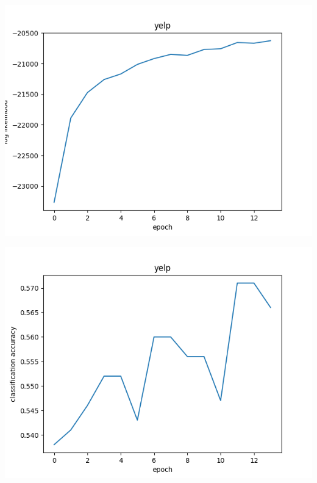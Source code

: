 \documentclass[letterpaper, 11pt]{article}
\begin{document}
\begin{multicols}{2}
\begin{center}
\includegraphics[scale=.3]{yelp_log_like_short}
\end{center}

\begin{center}
\includegraphics[scale=.3]{yelp_acc_short}
\end{center}


\end{multicols}
\end{document}
